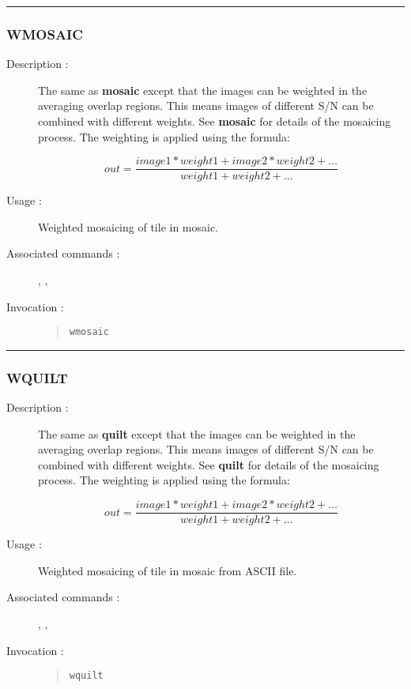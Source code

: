 \hrule 
\subsubsection*{\label{WMOSAIC}WMOSAIC}

\begin{description}

\item[Description :] The same as {\bf mosaic} except that the images
can be weighted in the averaging overlap regions.  This means images of
different S/N can be combined with different weights.  See {\bf mosaic}
for details of the mosaicing process.  The weighting is applied using
the formula:

\[out=\frac{image1*weight1+image2*weight2+\ldots}{weight1+weight2+\ldots}\]

\item[Usage :] Weighted mosaicing of tile in mosaic.

\item[Associated commands :] {\tt {}}, 
{\tt {}}, {\tt {}}

\item[Invocation :]

\begin{quote}{\tt  wmosaic }\end{quote}

\end{description}

\hrule 
\subsubsection*{\label{WQUILT}WQUILT}

\begin{description}

\item[Description :] The same as {\bf quilt} except that the images
can be weighted in the averaging overlap regions.  This means images of
different S/N can be combined with different weights.  See {\bf quilt} for
details of the mosaicing process. The weighting is applied using the
formula:

\[out=\frac{image1*weight1+image2*weight2+\ldots}{weight1+weight2+\ldots}\]

\item[Usage :] Weighted mosaicing of tile in mosaic from ASCII file.

\item[Associated commands :] {\tt {}}, 
{\tt {}}, {\tt {}}

\item[Invocation :]

\begin{quote}{\tt  wquilt }\end{quote}

\end{description}

